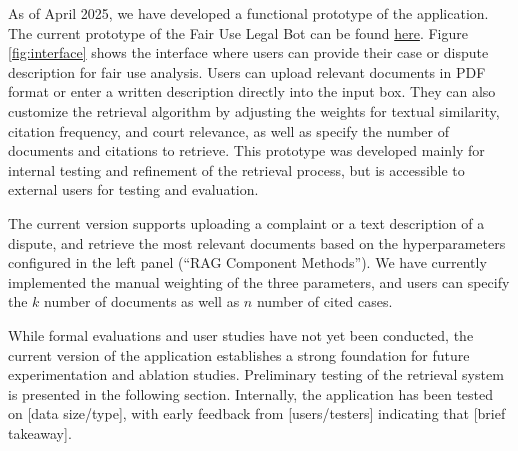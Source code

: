 As of April 2025, we have developed a functional prototype of the application. The current prototype of the Fair Use Legal Bot can be found \href{https://fairuselegalbot-main.streamlit.app/}{here}. Figure \ref{fig:interface} shows the interface where users can provide their case or dispute description for fair use analysis. Users can upload relevant documents in PDF format or enter a written description directly into the input box. They can also customize the retrieval algorithm by adjusting the weights for textual similarity, citation frequency, and court relevance, as well as specify the number of documents and citations to retrieve. This prototype was developed mainly for internal testing and refinement of the retrieval process, but is accessible to external users for testing and evaluation.

The current version supports uploading a complaint or a text description of a dispute, and retrieve the most relevant documents based on the hyperparameters configured in the left panel (``RAG Component Methods”). We have currently implemented the manual weighting of the three parameters, and users can specify the $k$ number of documents as well as $n$ number of cited cases. 

While formal evaluations and user studies have not yet been conducted, the current version of the application establishes a strong foundation for future experimentation and ablation studies. Preliminary testing of the retrieval system is presented in the following section. Internally, the application has been tested on [data size/type], with early feedback from [users/testers] indicating that [brief takeaway].
